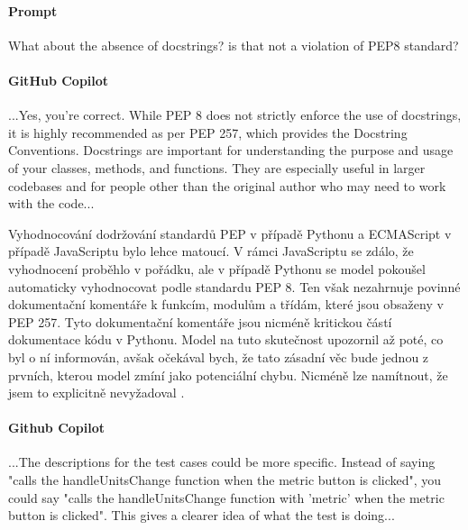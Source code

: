\documentclass[FM,DP]{tulthesis}
\begin{document}
		
		\vspace{0.6em}\begin{tcolorbox}[colback=white,colframe=black]
			\paragraph{Prompt}
			What about the absence of docstrings? is that not a violation of PEP8 standard?
			
			
			\vspace{0.6em}
			
			\paragraph{GitHub Copilot}
			...Yes, you're correct. While PEP 8 does not strictly enforce the use of docstrings, it is highly recommended as per PEP 257, which provides the Docstring Conventions. Docstrings are important for understanding the purpose and usage of your classes, methods, and functions. They are especially useful in larger codebases and for people other than the original author who may need to work with the code... \cite{pep257_fail}
		\end{tcolorbox}
		
		Vyhodnocování dodržování standardů PEP v případě Pythonu a ECMAScript v případě JavaScriptu bylo lehce matoucí. V rámci JavaScriptu se zdálo, že vyhodnocení proběhlo v pořádku, ale v případě Pythonu se model pokoušel automaticky vyhodnocovat podle standardu PEP 8. Ten však nezahrnuje povinné dokumentační komentáře k funkcím, modulům a třídám, které jsou obsaženy v PEP 257. Tyto dokumentační komentáře jsou nicméně kritickou částí dokumentace kódu v Pythonu. Model na tuto skutečnost upozornil až poté, co byl o ní informován, avšak očekával bych, že tato zásadní věc bude jednou z prvních, kterou model zmíní jako potenciální chybu. Nicméně lze namítnout, že jsem to explicitně nevyžadoval \cite{pep257_fail} \cite{PEP} \cite{ES}.
		
		\vspace{0.6em}
		\begin{tcolorbox}[colback=white,colframe=black]
			\paragraph{Github Copilot}
			...The descriptions for the test cases could be more specific. Instead of saying "calls the handleUnitsChange function when the metric button is clicked", you could say "calls the handleUnitsChange function with 'metric' when the metric button is clicked". This gives a clearer idea of what the test is doing... \cite{test_desc}
		\end{tcolorbox}
		
\end{document}
